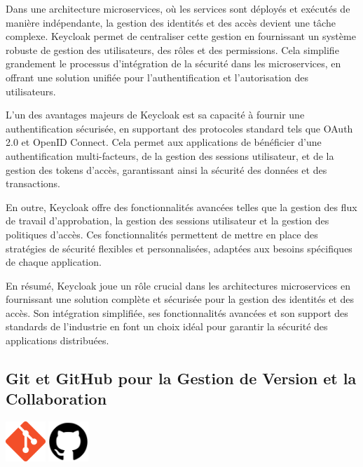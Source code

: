 \documentclass[a4paper, 11pt, openany]{report}
\begin{document}
Dans une architecture microservices, où les services sont déployés et exécutés de manière indépendante, la gestion des identités et des accès devient une tâche complexe. Keycloak permet de centraliser cette gestion en fournissant un système robuste de gestion des utilisateurs, des rôles et des permissions. Cela simplifie grandement le processus d'intégration de la sécurité dans les microservices, en offrant une solution unifiée pour l'authentification et l'autorisation des utilisateurs.

L'un des avantages majeurs de Keycloak est sa capacité à fournir une authentification sécurisée, en supportant des protocoles standard tels que OAuth 2.0 et OpenID Connect. Cela permet aux applications de bénéficier d'une authentification multi-facteurs, de la gestion des sessions utilisateur, et de la gestion des tokens d'accès, garantissant ainsi la sécurité des données et des transactions.

En outre, Keycloak offre des fonctionnalités avancées telles que la gestion des flux de travail d'approbation, la gestion des sessions utilisateur et la gestion des politiques d'accès. Ces fonctionnalités permettent de mettre en place des stratégies de sécurité flexibles et personnalisées, adaptées aux besoins spécifiques de chaque application.

En résumé, Keycloak joue un rôle crucial dans les architectures microservices en fournissant une solution complète et sécurisée pour la gestion des identités et des accès. Son intégration simplifiée, ses fonctionnalités avancées et son support des standards de l'industrie en font un choix idéal pour garantir la sécurité des applications distribuées.


\subsection{Git et GitHub pour la Gestion de Version et la Collaboration}
\begin{center}
\includegraphics[height=1.5cm]{git.png}
\includegraphics[height=1.5cm]{github.png}
\end{center}
\end{document}
